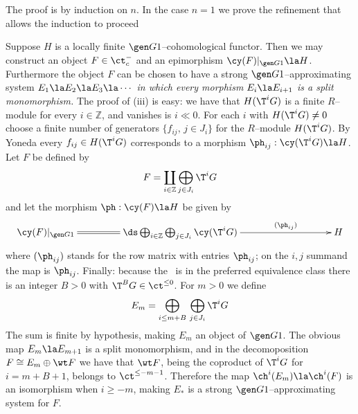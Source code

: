 \documentclass[11pt]{amsart}
\newcommand{\zz}{{\mathbb Z}}
\begin{document}
\prf
The proof is by induction on $n$. In the case $n=1$ we prove the 
refinement that allows the induction to proceed
\be
\setcounter{enumi}{\value{enumiv}}
\item
  Suppose $H$ is a locally finite $\gen G1$--cohomological functor.
  Then we may construct an
  object $F\in\ct^-_c$ and an epimorphism $\cy(F)|_{\gen G1}\la H$.
  Furthermore
  the object $F$ can be chosen to have a strong $\gen G1$--approximating
  system $E_1\la E_2\la E_3\la\cdots$ \emph{in which every morphism
  $E_i\la E_{i+1}$ is a split monomorphism.}
\setcounter{enumiv}{\value{enumi}}
\ee
The proof of (iii) is easy: we have that $H(\T^i G)$ is a finite $R$--module
for every
$i\in\zz$, and vanishes is $i\ll0$. For each $i$ with $H(\T^iG)\neq0$
choose a
finite number of generators $\{f_{ij},\,j\in J_i\}$
for the $R$--module $H(\T^iG)$. By
Yoneda
every $f_{ij}\in H(\T^iG)$ corresponds
to a morphism $\ph_{ij}^{}:\cy(\T^i G)\la H$. Let $F$ be
defined by
\[
F =\coprod_{i\in\zz}\bigoplus_{j\in J_i}\T^i G
\]
and let the morphism $\ph:\cy(F)\la H$
be given by
\[\xymatrix@C+20pt{
  \cy(F)|_{\gen G1}\ar@{=}[r]&
  \ds\bigoplus_{i\in\zz}\bigoplus_{j\in J_i}\cy(\T^iG)
  \ar[rr]^-{(\ph_{ij})} && H
}\]
where $(\ph_{ij})$ stands for the row matrix with entries $\ph_{ij}$; on
the $i,j$ summand the map is $\ph_{ij}$.
Finally: because the \tstr\ is in the preferred
equivalence class there is an integer $B>0$ with
$\T^BG\in\ct^{\leq0}$. For $m>0$ we define
\[
E_m=\bigoplus_{i\leq m+B}\,\bigoplus_{j\in J_i}\T^i G
\]
The sum is finite by hypothesis, making
$E_m$ an object of $\gen G1$. The obvious map $E_m\la E_{m+1}$
is a split monomorphism, and in the decomoposition $F\cong E_m\oplus \wt F$ we
have that $\wt F$, being the coproduct of $\T^iG$ for $i= m+B+1$,
belongs to $\ct^{\leq-m-1}$. Therefore the map $\ch^i(E_m)\la\ch^i(F)$
is an isomorphism when $i\geq-m$,
making $E_*$ is a strong $\gen G1$--approximating
system for $F$.
\end{document}
